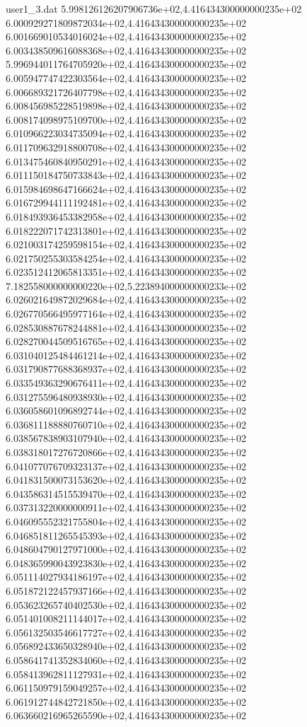 \begin{filecontents}{user1_3.dat}
5.998126126207906736e+02,4.416434300000000235e+02
6.000929271809872034e+02,4.416434300000000235e+02
6.001669010534016024e+02,4.416434300000000235e+02
6.003438509616088368e+02,4.416434300000000235e+02
5.996944011764705920e+02,4.416434300000000235e+02
6.005947747422303564e+02,4.416434300000000235e+02
6.006689321726407798e+02,4.416434300000000235e+02
6.008456985228519898e+02,4.416434300000000235e+02
6.008174098975109700e+02,4.416434300000000235e+02
6.010966223034735094e+02,4.416434300000000235e+02
6.011709632918800708e+02,4.416434300000000235e+02
6.013475460840950291e+02,4.416434300000000235e+02
6.011150184750733843e+02,4.416434300000000235e+02
6.015984698647166624e+02,4.416434300000000235e+02
6.016729944111192481e+02,4.416434300000000235e+02
6.018493936453382958e+02,4.416434300000000235e+02
6.018222071742313801e+02,4.416434300000000235e+02
6.021003174259598154e+02,4.416434300000000235e+02
6.021750255303584254e+02,4.416434300000000235e+02
6.023512412065813351e+02,4.416434300000000235e+02
7.182558000000000220e+02,5.223894000000000233e+02
6.026021649872029684e+02,4.416434300000000235e+02
6.026770566495977164e+02,4.416434300000000235e+02
6.028530887678244881e+02,4.416434300000000235e+02
6.028270044509516765e+02,4.416434300000000235e+02
6.031040125484461214e+02,4.416434300000000235e+02
6.031790877688368937e+02,4.416434300000000235e+02
6.033549363290676411e+02,4.416434300000000235e+02
6.031275596480938930e+02,4.416434300000000235e+02
6.036058601096892744e+02,4.416434300000000235e+02
6.036811188880760710e+02,4.416434300000000235e+02
6.038567838903107940e+02,4.416434300000000235e+02
6.038318017276720866e+02,4.416434300000000235e+02
6.041077076709323137e+02,4.416434300000000235e+02
6.041831500073153620e+02,4.416434300000000235e+02
6.043586314515539470e+02,4.416434300000000235e+02
6.037313220000000911e+02,4.416434300000000235e+02
6.046095552321755804e+02,4.416434300000000235e+02
6.046851811265545393e+02,4.416434300000000235e+02
6.048604790127971000e+02,4.416434300000000235e+02
6.048365990043923830e+02,4.416434300000000235e+02
6.051114027934186197e+02,4.416434300000000235e+02
6.051872122457937166e+02,4.416434300000000235e+02
6.053623265740402530e+02,4.416434300000000235e+02
6.051401008211144017e+02,4.416434300000000235e+02
6.056132503546617727e+02,4.416434300000000235e+02
6.056892433650328940e+02,4.416434300000000235e+02
6.058641741352834060e+02,4.416434300000000235e+02
6.058413962811127931e+02,4.416434300000000235e+02
6.061150979159049257e+02,4.416434300000000235e+02
6.061912744842721850e+02,4.416434300000000235e+02
6.063660216965265590e+02,4.416434300000000235e+02

\end{filecontents}
